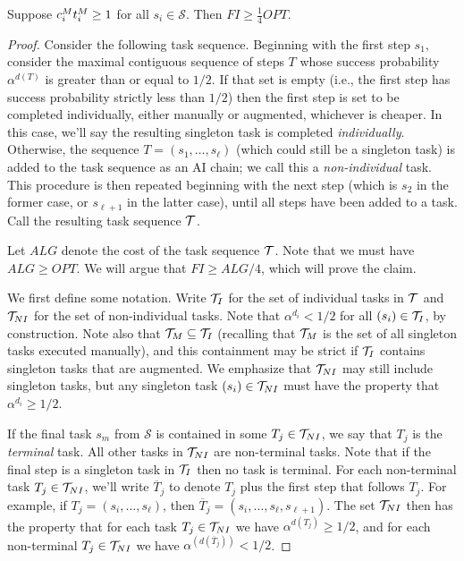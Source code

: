 \begin{lem}
\label{lem:FI.lower.bound.4}
    Suppose $c^{M}_{i}t^{M}_{i} \geq 1$ for all $s_i \in \mathcal{S}$.
    Then $FI \geq \tfrac{1}{4}OPT$.
\end{lem}
\begin{proof}

    Consider the following task sequence.
    Beginning with the first step $s_1$, consider the maximal contiguous sequence of steps $T$ whose success probability $\alpha^{d(T)}$ is greater than or equal to $1/2$.
    If that set is empty (i.e., the first step has success probability strictly less than $1/2$) then the first step is set to be completed individually, either manually or augmented, whichever is cheaper.
    In this case, we'll say the resulting singleton task is completed \emph{individually}.
    Otherwise, the sequence $T = (s_1, \dotsc, s_\ell)$ (which could still be a singleton task) is added to the task sequence as an AI chain; we call this a \emph{non-individual} task.
    This procedure is then repeated beginning with the next step (which is $s_2$ in the former case, or $s_{\ell+1}$ in the latter case), until all steps have been added to a task.
    Call the resulting task sequence $\mathcal{T}$.

    \medskip

    Let $ALG$ denote the cost of the task sequence $\mathcal{T}$.
    Note that we must have $ALG \geq OPT$.
    We will argue that $FI \geq ALG/4$, which will prove the claim.

    \medskip

    We first define some notation.
    Write $\mathcal{T}_I$ for the set of individual tasks in $\mathcal{T}$ and $\mathcal{T}_{NI}$ for the set of non-individual tasks.
    Note that $\alpha^{d_i} < 1/2$ for all $(s_i) \in \mathcal{T}_I$, by construction.
    Note also that $\mathcal{T}_{M} \subseteq \mathcal{T}_I$ (recalling that $\mathcal{T}_{M}$ is the set of all singleton tasks executed manually), and this containment may be strict if $\mathcal{T}_I$ contains singleton tasks that are augmented.
    We emphasize that $\mathcal{T}_{NI}$ may still include singleton tasks, but any singleton task $(s_i) \in \mathcal{T}_{NI}$ must have the property that $\alpha^{d_i} \geq 1/2$.

    If the final task $s_m$ from $\mathcal{S}$ is contained in some $T_j \in \mathcal{T}_{NI}$, we say that $T_j$ is the \emph{terminal} task.
    All other tasks in $\mathcal{T}_{NI}$ are non-terminal tasks.
Note that if the final step is a singleton task in $\mathcal{T}_I$ then no task is terminal.
    For each non-terminal task $T_j \in \mathcal{T}_{NI}$, we'll write $\overline{T}_j$ to denote $T_j$ plus the first step that follows $T_j$.
    For example, if $T_j = (s_i, \dotsc, s_\ell)$, then $\overline{T}_j = (s_i, \dotsc, s_\ell, s_{\ell+1})$.
    The set $\mathcal{T}_{NI}$ then has the property that for each task $T_j \in \mathcal{T}_{NI}$ we have $\alpha^{d(T_j)} \geq 1/2$, and for each non-terminal $T_j \in \mathcal{T}_{NI}$ we have $\alpha^{(d(\overline{T}_j))} < 1/2$.


\end{proof}
